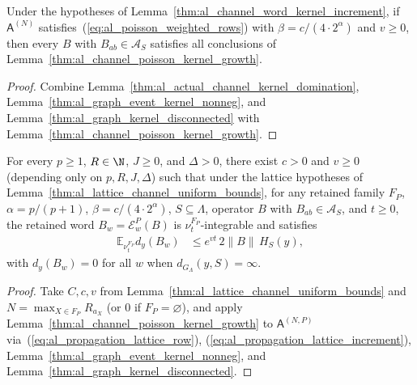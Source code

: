 \begin{lemma}
    \label{thm:al_channel_poisson_graph_growth}
    \leanok
    Under the hypotheses of Lemma~\ref{thm:al_channel_word_kernel_increment},
    if $\mathsf A^{(N)}$ satisfies~(\ref{eq:al_poisson_weighted_rows}) with
    $\beta=c/(4\cdot2^\alpha)$ and $v\ge0$, then every $B$ with
    $B_{ab}\in\mathcal A_S$ satisfies all conclusions of
    Lemma~\ref{thm:al_channel_poisson_kernel_growth}.
\end{lemma}
\begin{proof}
    \leanok
    Combine Lemma~\ref{thm:al_actual_channel_kernel_domination},
    Lemma~\ref{thm:al_graph_event_kernel_nonneg}, and
    Lemma~\ref{thm:al_graph_kernel_disconnected} with
    Lemma~\ref{thm:al_channel_poisson_kernel_growth}.
\end{proof}

\begin{lemma}
    \label{thm:al_channel_poisson_lattice_growth}
    \leanok
    For every $p\ge1$, $R\in\N$, $J\ge0$, and $\Delta>0$, there exist $c>0$
    and $v\ge0$ (depending only on $p,R,J,\Delta$) such that under the lattice
    hypotheses of Lemma~\ref{thm:al_lattice_channel_uniform_bounds}, for any
    retained family $F_P$, $\alpha=p/(p+1)$, $\beta=c/(4\cdot2^\alpha)$,
    $S\subseteq\Lambda$, operator $B$ with $B_{ab}\in\mathcal A_S$, and
    $t\ge0$, the retained word $B_w=\mathcal E_w^P(B)$ is
    $\nu_t^{F_P}$-integrable and satisfies
    \begin{align}
        \label{eq:al_poisson_lattice_decay}
        \mathbb E_{\nu_t^{F_P}}d_y(B_w)
         & \le e^{vt}\,2\|B\|\,H_S(y),
    \end{align}
    with $d_y(B_w)=0$ for all $w$ when $d_{G_\Lambda}(y,S)=\infty$.
\end{lemma}
\begin{proof}
    \leanok
    Take $C,c,v$ from Lemma~\ref{thm:al_lattice_channel_uniform_bounds} and
    $N=\max_{X\in F_P}R_{a_X}$ (or $0$ if $F_P=\varnothing$), and apply
    Lemma~\ref{thm:al_channel_poisson_kernel_growth} to $\mathsf A^{(N,P)}$
    via~(\ref{eq:al_propagation_lattice_row}),
    (\ref{eq:al_propagation_lattice_increment}),
    Lemma~\ref{thm:al_graph_event_kernel_nonneg}, and
    Lemma~\ref{thm:al_graph_kernel_disconnected}.
\end{proof}

